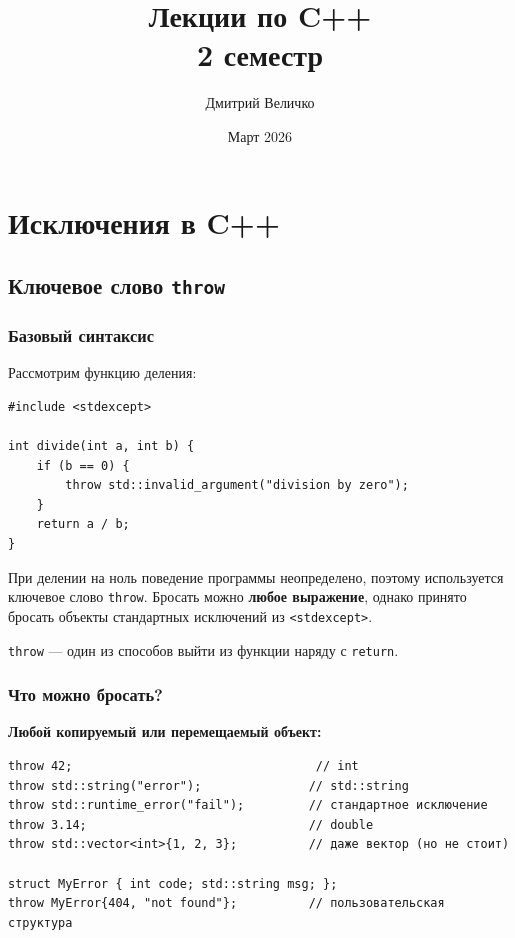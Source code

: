 \documentclass[a4paper,12pt]{article}
\title{\textbf{Лекции по C++}\\\large 2 семестр}
\author{Дмитрий Величко}
\date{Март 2026}
\begin{document}
\maketitle
\tableofcontents
\newpage





\section{Исключения в C++}

\subsection{Ключевое слово \texttt{throw}}

\subsubsection{Базовый синтаксис}

Рассмотрим функцию деления:

\begin{lstlisting}
#include <stdexcept>

int divide(int a, int b) {
    if (b == 0) {
        throw std::invalid_argument("division by zero");
    }
    return a / b;
}
\end{lstlisting}

При делении на ноль поведение программы неопределено, поэтому используется
ключевое слово \texttt{throw}. Бросать можно \textbf{любое выражение},
однако принято бросать объекты стандартных исключений из
\texttt{<stdexcept>}.

\texttt{throw} --- один из способов выйти из функции наряду с
\texttt{return}.

\subsubsection{Что можно бросать?}

\textbf{Любой копируемый или перемещаемый объект:}

\begin{lstlisting}
throw 42;                                  // int
throw std::string("error");               // std::string
throw std::runtime_error("fail");         // стандартное исключение
throw 3.14;                               // double
throw std::vector<int>{1, 2, 3};          // даже вектор (но не стоит)

struct MyError { int code; std::string msg; };
throw MyError{404, "not found"};          // пользовательская структура
\end{lstlisting}
\end{document}
